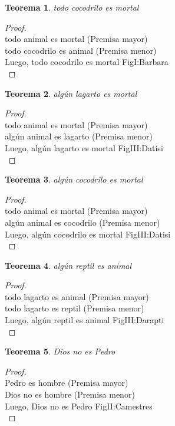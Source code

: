 ﻿\documentclass[12pt]{book}
\newtheorem{theorem}{Teorema}[chapter]
\newtheorem{proof}{Demostración}
\begin{document}
\begin{theorem}
todo cocodrilo es mortal
\label{th: 96}
\end{theorem}\begin{proof}\\todo animal es mortal	 (Premisa mayor) \\todo cocodrilo es animal	 (Premisa menor) \\Luego, todo cocodrilo es mortal	FigI:Barbara \\ \end{proof}
\begin{theorem}
algún lagarto es mortal
\label{th: 97}
\end{theorem}\begin{proof}\\todo animal es mortal	 (Premisa mayor) \\algún animal es lagarto	 (Premisa menor) \\Luego, algún lagarto es mortal	FigIII:Datisi \\ \end{proof}
\begin{theorem}
algún cocodrilo es mortal
\label{th: 98}
\end{theorem}\begin{proof}\\todo animal es mortal	 (Premisa mayor) \\algún animal es cocodrilo	 (Premisa menor) \\Luego, algún cocodrilo es mortal	FigIII:Datisi \\ \end{proof}
\begin{theorem}
algún reptil es animal
\label{th: 99}
\end{theorem}\begin{proof}\\todo lagarto es animal	 (Premisa mayor) \\todo lagarto es reptil	 (Premisa menor) \\Luego, algún reptil es animal	FigIII:Darapti \\ \end{proof}
\begin{theorem}
Dios no es Pedro
\label{th: 100}
\end{theorem}\begin{proof}\\Pedro es hombre	 (Premisa mayor) \\Dios no es hombre	 (Premisa menor) \\Luego, Dios no es Pedro	FigII:Camestres \\ \end{proof}
\end{document}
